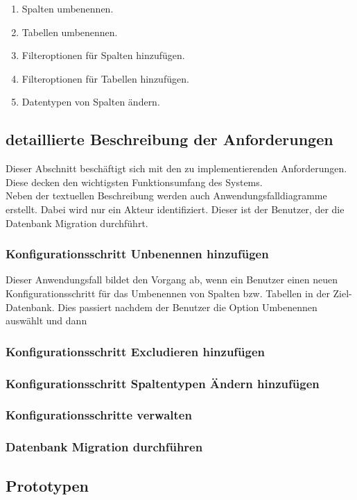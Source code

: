 \begin{enumerate}
	\item Spalten  umbenennen.
	\item Tabellen umbenennen.
	\item Filteroptionen für Spalten hinzufügen.
	\item Filteroptionen für Tabellen hinzufügen.
	\item Datentypen von Spalten ändern.
\end{enumerate}

\subsection{detaillierte Beschreibung der Anforderungen}
Dieser Abschnitt beschäftigt sich mit den zu implementierenden Anforderungen. Diese decken den wichtigsten Funktionsumfang des Systems.\\
Neben der textuellen Beschreibung werden auch Anwendungsfalldiagramme erstellt. Dabei wird nur ein Akteur identifiziert. Dieser ist der Benutzer, der die Datenbank Migration durchführt.
\subsubsection{Konfigurationsschritt \textbf{Unbenennen} hinzufügen}
Dieser Anwendungsfall bildet den Vorgang ab, wenn ein Benutzer einen neuen Konfigurationsschritt für das Umbenennen von Spalten bzw. Tabellen in der Ziel-Datenbank. Dies passiert nachdem der Benutzer die Option Umbenennen auswählt und dann
\subsubsection{Konfigurationsschritt \textbf{Excludieren} hinzufügen}
\subsubsection{Konfigurationsschritt \textbf{Spaltentypen Ändern} hinzufügen}
\subsubsection{Konfigurationsschritte verwalten}
\subsubsection{Datenbank Migration durchführen}

\subsection{Prototypen}
